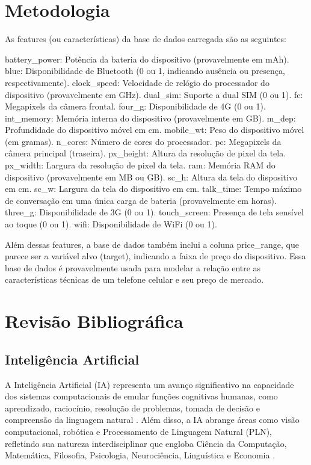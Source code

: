 \documentclass[conference]{IEEEtran}
\begin{document}
\section{Metodologia}


As features (ou características) da base de dados carregada são as seguintes:

    battery_power: Potência da bateria do dispositivo (provavelmente em mAh).
    blue: Disponibilidade de Bluetooth (0 ou 1, indicando ausência ou presença, respectivamente).
    clock_speed: Velocidade de relógio do processador do dispositivo (provavelmente em GHz).
    dual_sim: Suporte a dual SIM (0 ou 1).
    fc: Megapixels da câmera frontal.
    four_g: Disponibilidade de 4G (0 ou 1).
    int_memory: Memória interna do dispositivo (provavelmente em GB).
    m_dep: Profundidade do dispositivo móvel em cm.
    mobile_wt: Peso do dispositivo móvel (em gramas).
    n_cores: Número de cores do processador.
    pc: Megapixels da câmera principal (traseira).
    px_height: Altura da resolução de pixel da tela.
    px_width: Largura da resolução de pixel da tela.
    ram: Memória RAM do dispositivo (provavelmente em MB ou GB).
    sc_h: Altura da tela do dispositivo em cm.
    sc_w: Largura da tela do dispositivo em cm.
    talk_time: Tempo máximo de conversação em uma única carga de bateria (provavelmente em horas).
    three_g: Disponibilidade de 3G (0 ou 1).
    touch_screen: Presença de tela sensível ao toque (0 ou 1).
    wifi: Disponibilidade de WiFi (0 ou 1).

Além dessas features, a base de dados também inclui a coluna price_range, que parece ser a variável alvo (target), indicando a faixa de preço do dispositivo. Essa base de dados é provavelmente usada para modelar a relação entre as características técnicas de um telefone celular e seu preço de mercado. ​
​




\section{Revisão Bibliográfica}

\subsection{Inteligência Artificial}
A Inteligência Artificial (IA) representa um avanço significativo na capacidade 
dos sistemas computacionais de emular funções cognitivas humanas, como 
aprendizado, raciocínio, resolução de problemas, tomada de decisão 
e compreensão da linguagem natural \cite{Russell2016}. 
Além disso, a IA abrange áreas como visão computacional, robótica e 
Processamento de Linguagem Natural (PLN), refletindo sua natureza interdisciplinar 
que engloba Ciência da Computação, Matemática, Filosofia, Psicologia, 
Neurociência, Linguística e Economia \cite{Poole2010}.
\end{document}
